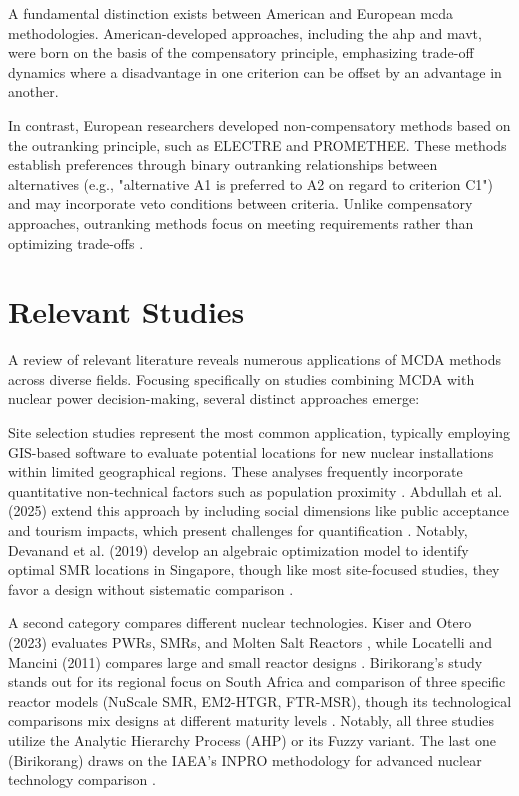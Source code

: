 A fundamental distinction exists between American and European \gls{mcda} methodologies. American-developed approaches, including the \gls{ahp} and \gls{mavt}, were born on the basis of the compensatory principle, emphasizing trade-off dynamics where a disadvantage in one criterion can be offset by an advantage in another.

In contrast, European researchers developed non-compensatory methods based on the outranking principle, such as ELECTRE and PROMETHEE. These methods establish preferences through binary outranking relationships between alternatives (e.g., "alternative A1 is preferred to A2 on regard to criterion C1") and may incorporate veto conditions between criteria. Unlike compensatory approaches, outranking methods focus on meeting requirements rather than optimizing trade-offs \cite{HUANG2026103438, Köksalan2016}.

\section{Relevant Studies}
A review of relevant literature reveals numerous applications of MCDA methods across diverse fields. Focusing specifically on studies combining MCDA with nuclear power decision-making, several distinct approaches emerge:

Site selection studies represent the most common application, typically employing GIS-based software to evaluate potential locations for new nuclear installations within limited geographical regions. These analyses frequently incorporate quantitative non-technical factors such as population proximity \cite{DAMOOM2019110} \cite{BASEGMEZ2025105897}. Abdullah et al. (2025) extend this approach by including social dimensions like public acceptance and tourism impacts, which present challenges for quantification \cite{ABDULLAH2025105626}. Notably, Devanand et al. (2019) develop an algebraic optimization model to identify optimal SMR locations in Singapore, though like most site-focused studies, they favor a design without sistematic comparison \cite{DEVANAND2019339}.

A second category compares different nuclear technologies. Kiser and Otero (2023) evaluates PWRs, SMRs, and Molten Salt Reactors \cite{KISER2023104647}, while Locatelli and Mancini (2011) compares large and small reactor designs \cite{Locatelli01092012}. Birikorang's study stands out for its regional focus on South Africa and comparison of three specific reactor models (NuScale SMR, EM2-HTGR, FTR-MSR), though its technological comparisons mix designs at different maturity levels \cite{BIRIKORANG2026111837}. Notably, all three studies utilize the Analytic Hierarchy Process (AHP) or its Fuzzy variant. The last one (Birikorang) draws on the IAEA's INPRO methodology for advanced nuclear technology comparison \cite{IAEA_INPRO_2019}.


